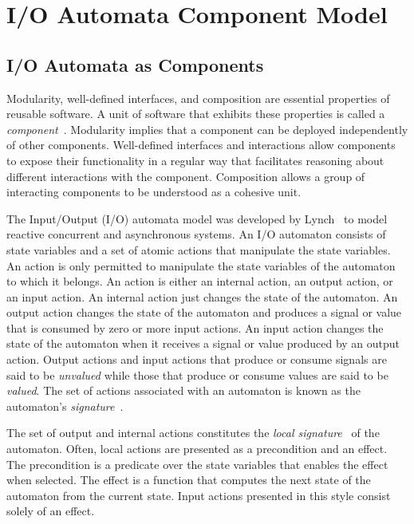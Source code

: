 \section{I/O Automata Component Model\label{system_model}}

\subsection{I/O Automata as Components}

Modularity, well-defined interfaces, and composition are essential properties of reusable software.
A unit of software that exhibits these properties is called a \emph{component}~\cite{szyperski2002component}.
Modularity implies that a component can be deployed independently of other components.
Well-defined interfaces and interactions allow components to expose their functionality in a regular way that facilitates reasoning about different interactions with the component.
Composition allows a group of interacting components to be understood as a cohesive unit.

The Input/Output (I/O) automata model was developed by Lynch~\cite{lynch1996distributed} to model reactive concurrent and asynchronous systems.
An I/O automaton consists of state variables and a set of atomic actions that manipulate the state variables.
An action is only permitted to manipulate the state variables of the automaton to which it belongs.
An action is either an internal action, an output action, or an input action.
An internal action just changes the state of the automaton.
An output action changes the state of the automaton and produces a signal or value that is consumed by zero or more input actions.
An input action changes the state of the automaton when it receives a signal or value produced by an output action.
Output actions and input actions that produce or consume signals are said to be \emph{unvalued} while those that produce or consume values are said to be \emph{valued}.
The set of actions associated with an automaton is known as the automaton's \emph{signature}~\cite{lynch1996distributed}.

The set of output and internal actions constitutes the \emph{local signature}~\cite{lynch1996distributed} of the automaton.
Often, local actions are presented as a precondition and an effect.
The precondition is a predicate over the state variables that enables the effect when selected.
The effect is a function that computes the next state of the automaton from the current state.
Input actions presented in this style consist solely of an effect.

